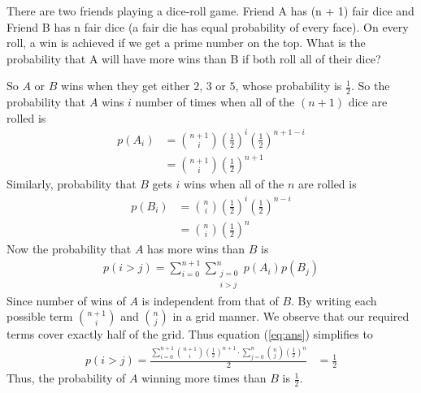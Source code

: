 \begin{que}
	There are two friends playing a dice-roll game. Friend A has (n + 1) fair dice and Friend B has n
	fair dice (a fair die has equal probability of every face). On every roll, a win is achieved if we get a
	prime number on the top. What is the probability that A will have more wins than B if both roll
	all of their dice?
\end{que}
\begin{tcolorbox}
	\begin{sol}
		So $A$ or $B$ wins when they get either $2$, $3$ or $5$, whose probability is $\frac{1}{2}$. So the probability that $A$ wins $i$ number of times when all of the $(n+1)$ dice are rolled is
		\begin{align}
			p(A_i) & = \binom{n+1}{i} \left(\frac{1}{2}\right)^{i} \left(\frac{1}{2}\right)^{n+1-i} \\
			       & = \binom{n+1}{i} \left(\frac{1}{2}\right)^{n+1}
		\end{align}
		Similarly, probability that $B$ gets $i$ wins when all of the $n$ are rolled is
		\begin{align}
			p(B_i) & = \binom{n}{i} \left(\frac{1}{2}\right)^{i} \left(\frac{1}{2}\right)^{n-i} \\
			       & = \binom{n}{i} \left(\frac{1}{2}\right)^{n}
		\end{align}
		Now the probability that $A$ has more wins than $B$ is
		\begin{align}
			p(i>j) = \sum_{i=0}^{n+1}\sum_{\substack{j=0 \\ i>j}}^{n} p(A_i)p(B_j)
			\label{eq:ans}
		\end{align}
		Since number of wins of $A$ is independent from that of $B$.
		By writing each possible term $\binom{n+1}{i}$ and $\binom{n}{j}$ in a grid manner. We observe that our required terms cover exactly half of the grid. Thus equation (\ref{eq:ans}) simplifies to
		\begin{align}
			p(i>j) = \frac{\sum_{i=0}^{n+1}\binom{n+1}{i}\left(\frac{1}{2}\right)^{n+1}\cdot\sum_{j=0}^{n}\binom{n}{j}\left(\frac{1}{2}\right)^{n}}{2}
			 & = \frac{1}{2}
		\end{align}
		Thus, the probability of $A$ winning more times than $B$ is $\frac{1}{2}$.
	\end{sol}
\end{tcolorbox}
